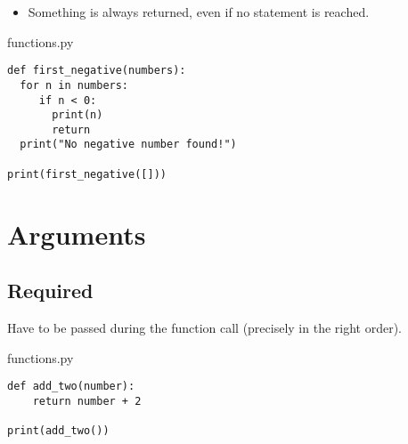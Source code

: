 \documentclass[aspectratio=1610,slidestop]{beamer}
\begin{document}
\begin{pframe}
 \begin{itemize}
  \item Something is always returned, even if no  statement is reached.
 \end{itemize}
 \medskip

 \begin{minipage}[t]{0.52\textwidth}
  \begin{pythonfile}{functions.py}
   \begin{verbatim}
def first_negative(numbers):
  for n in numbers:
     if n < 0:
       print(n)
       return
  print("No negative number found!")

print(first_negative([]))
   \end{verbatim}
  \end{pythonfile}
 \end{minipage}\qquad
 \pause
 \begin{minipage}[t]{0.42\textwidth}
 \vspace{-4.15cm}
 \begin{terminal}
 \end{terminal}
 \end{minipage}
\end{pframe}



\section{Arguments}

\subsection{Required}
\begin{pframe}
  Have to be passed during the function call (precisely in the right order).
 \begin{pythonfile}{functions.py}
  \begin{verbatim}
def add_two(number):
    return number + 2

print(add_two())
  \end{verbatim}
 \end{pythonfile}
 \pause
 \begin{terminal}
 \end{terminal}
\end{pframe}
\end{document}
